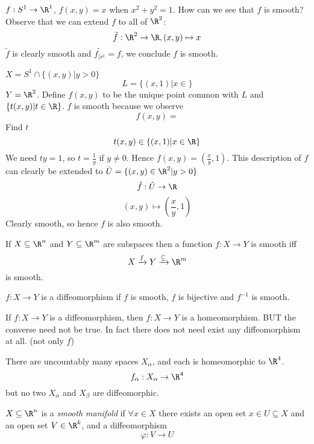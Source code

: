 \begin{example}
  $f:S^1\to \R^1$, $f(x,y)=x$ when $x^2+y^2=1$.
  \newline
  How can we see that $f$ is smooth?
  \newline
  Observe that we can extend $f$ to all of $\R^2$:
    $$\tilde{f}:\R^2 \to \R, (x,y)\mapsto x$$
  $\tilde{f}$ is clearly smooth and $\tilde{f_{\rvert s^1}}=f$, we conclude $f$ is smooth.
\end{example}

\begin{example}
  $X=S^1\cap \{ (x,y) | y>0\}$
  $$L=\{(x,1)|x\in \}$$
  $Y=\R^2$. Define $f(x,y)$ to be the unique point common with $L$ and $\{ t(x,y)| t\in \R \}$.
  \newline
  $f$ is smooth because we observe
    $$f(x,y)=$$
  Find $t$
    $$t(x,y)\in \{ (x,1)| x\in \R\}$$
  We need $ty=1$, so $t=\frac{1}{y}$ if $y\neq 0$. Hence $f(x,y)=(\frac{x}{y},1)$. This description of $f$ can clearly be extended to $\tilde{U}=\{(x,y)\in \R^2 | y>0\}$
      $$\tilde{f}:\tilde{U} \to \R$$
      $$(x,y)\mapsto (\frac{x}{y},1)$$
    Clearly smooth, so hence $f$ is also smooth.
\end{example}

\begin{definition}
  If $X \subseteq \R^n$ and $Y\subseteq \R^m$ are subspaces then a function $f:X\to Y$ is smooth iff
    $$X\xrightarrow{f} Y \xrightarrow{\subseteq} \R^m$$
  is smooth.
\end{definition}

\begin{definition}
  $f:X\to Y$ is a diffeomorphism if $f$ is smooth, $f$ is bijective and $f^{-1}$ is smooth.
\end{definition}
\begin{remark}
  If $f:X\to Y$ is a diffeomorphism, then $f:X\to Y$ is a homeomorphism.
  \newline
  BUT the converse need not be true. In fact there does not need exist any diffeomorphism at all. (not only $f$)
\end{remark}

\begin{example}
  There are uncountably many spaces $X_{\alpha}$, and each is homeomorphic to $\R^4$.
    $$f_\alpha: X_\alpha \to \R^4 $$
  but no two $X_\alpha$ and $X_\beta$ are diffeomorphic.
\end{example}

\begin{definition}
  $X\subseteq \R^n$ is a \emph{smooth manifold} if $\forall x\in X$ there exists an open set $x\in U\subseteq X$ and an open set $V\in \R^k$, and a diffeomorphism
    $$\varphi:V\to U$$
\end{definition}

